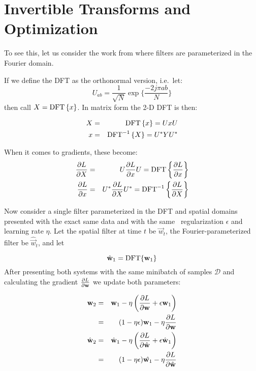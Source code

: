 \chapter{Invertible Transforms and Optimization} \label{app:ch6:invertible}
To see this, let us consider the work from \cite{rippel_spectral_2015} where
filters are parameterized in the Fourier domain. 

If we define the DFT as the orthonormal version, i.e.\ let:
$$ U_{ab} = \frac{1}{\sqrt{N}} \exp\{ \frac{-2j\pi ab}{N} \} $$
%
then call $X = \mathrm{DFT}\left\{x\right\}$. In matrix form the 2-D DFT is then:

\begin{eqnarray}
  X &=& \mathrm{DFT}\left\{x\right\} = UxU \\
  x &=& \mathrm{DFT}^{-1}\left\{X\right\} = U^*YU^* 
\end{eqnarray}

When it comes to gradients, these become:
\begin{eqnarray}
  \frac{\partial L}{\partial X} &=& U \frac{\partial L}{\partial x} U = \mathrm{DFT}\left\{\frac{\partial L}{\partial x}\right\} \label{eq:ch6:dft_grad}\\
  \frac{\partial L}{\partial x} &=& U^* \frac{\partial L}{\partial X} U^* = \mathrm{DFT}^{-1}\left\{\frac{\partial L}{\partial X}\right\}
\end{eqnarray}

Now consider a single filter parameterized in the DFT and spatial domains
presented with the exact same data and with the same \ltwo\ regularization
$\epsilon$ and learning rate $\eta$. Let
the spatial filter at time $t$ be $\vec{w}_t$, the Fourier-parameterized
filter be $\hat{\vec{w}}_t$, and let 

\begin{equation}
  \hat{\mathbf{w}}_1 = \mathrm{DFT}\{\mathbf{w}_1\} \label{eq:ch6:initial_condition}
\end{equation}
%
After presenting both systems with the same minibatch of samples $\mathcal{D}$
and calculating the gradient $\frac{\partial L}{\partial \mathbf{w}}$ we update both parameters:

\begin{eqnarray}
  \mathbf{w}_2 & = & \mathbf{w}_1 - \eta \left(
    \frac{\partial L}{\partial \mathbf{w}} + \epsilon \mathbf{w}_1 \right) \\
    &=& (1-\eta\epsilon)\mathbf{w}_1 - \eta \frac{\partial L}{\partial \mathbf{w}} \\
  \hat{\mathbf{w}}_2 & = & \hat{\mathbf{w}}_1 - \eta \left(
     \frac{\partial L}{\partial \hat{\mathbf{w}}} + \epsilon \hat{\mathbf{w}}_1 \right)  \\
     &=& (1-\eta\epsilon)\hat{\mathbf{w}_1} - \eta \frac{\partial L}{\partial \hat{\mathbf{w}}} \\
\end{eqnarray}

